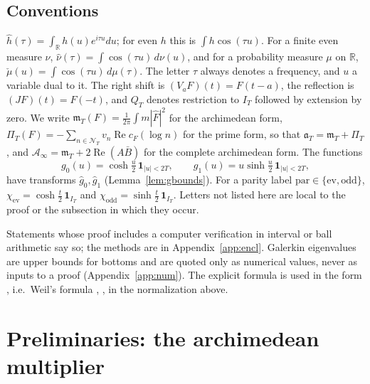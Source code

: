 \documentclass[11pt]{amsart}
\theoremstyle{definition}
\theoremstyle{remark}
\newcommand{\R}{\mathbb R}
\newcommand{\Rel}{\operatorname{Re}}
\newcommand{\IT}{I_T}
\newcommand{\gh}[1]{\widehat g_{#1}}
\newcommand{\nuh}{\widehat\nu}
\newcommand{\Fh}{\widehat F}
\newcommand{\cF}{c_F}
\newcommand{\NT}{\mathcal N_T}
\newcommand{\Ainf}{\mathcal A_\infty}
\newcommand{\PiT}{\Pi_T}
\newcommand{\mT}{\mathfrak m_T}
\begin{document}
\subsection{Conventions}\label{subsec:conv}
$\widehat h(\tau)=\int_\R h(u)e^{i\tau u}du$; for even $h$ this is $\int h\cos(\tau u)$. For a finite even
measure $\nu$, $\nuh(\tau)=\int\cos(\tau u)\,d\nu(u)$, and for a probability measure $\mu$ on $\R$,
$\check\mu(u)=\int\cos(\tau u)\,d\mu(\tau)$. The letter $\tau$ always denotes a frequency, and $u$ a
variable dual to it. The right shift is $(V_aF)(t)=F(t-a)$, the reflection is $(JF)(t)=F(-t)$, and $Q_T$
denotes restriction to $\IT$ followed by extension by zero. We write $\mT(F)=\frac1{2\pi}\int m|\Fh|^2$
for the archimedean form, $\PiT(F)=-\sum_{n\in\NT}v_n\Rel\cF(\log n)$ for the prime form, so that
$\mathfrak a_T=\mT+\PiT$, and $\Ainf=\mT+2\Rel(A\bar B)$ for the complete archimedean form. The functions
\begin{equation}\label{eq:g}
g_0(u)=\cosh\tfrac u2\,\mathbf 1_{|u|<2T},\qquad g_1(u)=u\sinh\tfrac u2\,\mathbf 1_{|u|<2T},
\end{equation}
have transforms $\gh0,\gh1$ (Lemma~\ref{lem:gbounds}). For a parity label
$\mathrm{par}\in\{\mathrm{ev},\mathrm{odd}\}$, $\chi_{\mathrm{ev}}=\cosh\frac t2\,\mathbf 1_{\IT}$ and
$\chi_{\mathrm{odd}}=\sinh\frac t2\,\mathbf 1_{\IT}$. Letters not listed here are local to the proof or
the subsection in which they occur.

Statements whose proof includes a computer verification in interval or ball arithmetic say so; the
methods are in Appendix~\ref{app:encl}. Galerkin eigenvalues are upper bounds for bottoms and are quoted
only as numerical values, never as inputs to a proof (Appendix~\ref{app:num}). The explicit formula is used
in the form \cite[Thm.~8.4]{Paper45}, i.e.\ Weil's formula \cite{Weil52}, \cite[Thm.~5.12]{IK}, in the
normalization above.


\section{Preliminaries: the archimedean multiplier}\label{sec:levy}
\end{document}
